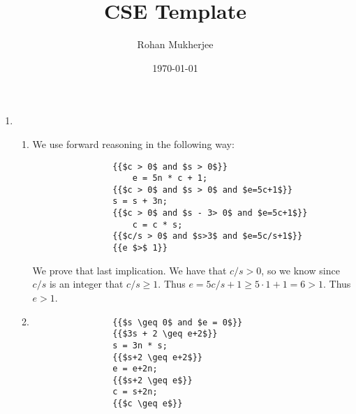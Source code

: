 \documentclass[12pt]{article}
\title{CSE Template}
\date{\today}
\author{Rohan Mukherjee}
\theoremstyle{definitionstyle}
\begin{document}
    \maketitle
    \begin{enumerate}[labelindent=0pt, labelwidth=!, wide]
        \item \begin{enumerate}[leftmargin=0pt, label=(\alph*), labelindent=0pt, labelwidth=!, wide]
            \item 
            We use forward reasoning in the following way:
            \begin{lstlisting}
                {{$c > 0$ and $s > 0$}}
                    e = 5n * c + 1;
                {{$c > 0$ and $s > 0$ and $e=5c+1$}}
                s = s + 3n; 
                {{$c > 0$ and $s - 3> 0$ and $e=5c+1$}}
                    c = c * s; 
                {{$c/s > 0$ and $s>3$ and $e=5c/s+1$}}
                {{e $>$ 1}}
            \end{lstlisting}
            
            We prove that last implication. We have that $c/s > 0$, so we know since $c/s$ is an integer that $c/s \geq 1$. Thus $e = 5c/s+1 \geq 5 \cdot 1 + 1 = 6 > 1$. Thus $e > 1$.
    
            \item 
            \begin{lstlisting}
                {{$s \geq 0$ and $e = 0$}}
                {{$3s + 2 \geq e+2$}}
                s = 3n * s;
                {{$s+2 \geq e+2$}}
                e = e+2n;
                {{$s+2 \geq e$}}
                c = s+2n;
                {{$c \geq e$}}
            \end{lstlisting}
            

\end{enumerate}
\end{enumerate}
\end{document}
